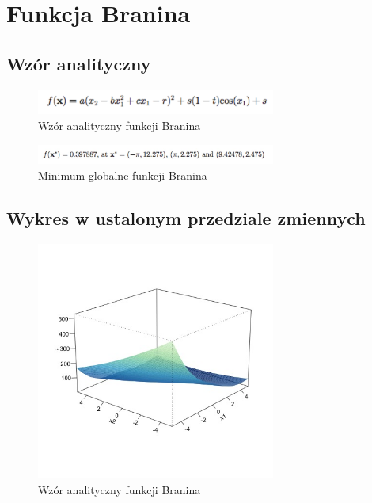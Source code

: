 \documentclass{article}
\begin{document}
          
          
          
          
                 
 \clearpage                
\newpage
\section{Funkcja Branina}
\subsection{Wzór analityczny}
\begin{figure}[!htbp]
    \centering
    \includegraphics[width=0.7\textwidth]{inc/wzory/branin}
     \caption{Wzór analityczny funkcji Branina}
    \end{figure}                 

\begin{figure}[!htbp]
    \centering
    \includegraphics[width=0.7\textwidth]{inc/wzory/branin-global-minimum}
     \caption{Minimum globalne funkcji Branina}
    \end{figure}             
    
\subsection{Wykres w ustalonym przedziale zmiennych  }
       \begin{figure}[!htbp]
    \centering
    \includegraphics[width=0.7\textwidth]{inc/wykresyfunkcji/branin}
     \caption{Wzór analityczny funkcji Branina}
    \end{figure}                 
\end{document}
